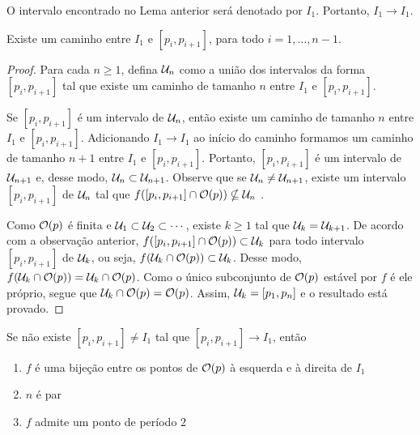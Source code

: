 O intervalo encontrado no Lema anterior será denotado por $I_1$. Portanto, $I_1 \longrightarrow I_1$.

\begin{lemma}
Existe um caminho entre $I_1$ e $[p_i, p_{i+1}]$, para todo $i = 1, \dots, n-1$.
\end{lemma}

\begin{proof}
Para cada $n \geq 1$, defina $\mathcal{U}_n$ como a união dos intervalos da forma $[p_i, p_{i+1}]$ tal que existe um caminho de tamanho $n$ entre $I_1$ e $[p_i, p_{i+1}]$.

Se $[p_i, p_{i+1}]$ é um intervalo de $\mathcal{U}_n$, então existe um caminho de tamanho $n$ entre $I_1$ e $[p_i, p_{i+1}]$. Adicionando $I_1 \longrightarrow I_1$ ao início do caminho formamos um caminho de tamanho $n+1$ entre  $I_1$ e $[p_i, p_{i+1}]$. Portanto, $[p_i, p_{i+1}]$ é um intervalo de $\mathcal{U}_{n+1}$ e, desse modo, $\mathcal{U}_n \subset \mathcal{U}_{n+1}$. Observe que se $\mathcal{U}_n \neq \mathcal{U}_{n+1}$, existe um intervalo  $[p_i, p_{i+1}]$ de $\mathcal{U}_n$ tal que $f([p_i, p_{i+1}] \cap \mathcal{O}(p)) \nsubseteq \mathcal{U}_n$ .

Como $\mathcal{O}(p)$ é finita e $\mathcal{U}_1 \subset \mathcal{U}_2 \subset \cdots$, existe $k \geq 1$ tal que $\mathcal{U}_k = \mathcal{U}_{k+1}$. De acordo com a observação anterior, $f([p_i, p_{i+1}] \cap \mathcal{O}(p)) \subset \mathcal{U}_k$ para todo intervalo $[p_i, p_{i+1}]$ de $\mathcal{U}_k$, ou seja, $f(\mathcal{U}_k \cap \mathcal{O}(p)) \subset \mathcal{U}_k$. Desse modo, $f(\mathcal{U}_k \cap \mathcal{O}(p)) = \mathcal{U}_k \cap \mathcal{O}(p)$. Como o único subconjunto de $\mathcal{O}(p)$ estável por $f$ é ele próprio, segue que $\mathcal{U}_k \cap \mathcal{O}(p) = \mathcal{O}(p)$. Assim, $\mathcal{U}_k = [p_1, p_n]$ e o resultado está provado.
\end{proof}

\begin{lemma}
Se não existe $[p_i, p_{i+1}]  \neq I_1$  tal que $[p_i, p_{i+1}] \longrightarrow I_1$, então
\begin{enumerate}
\item $f$ é uma bijeção entre os pontos de $\mathcal{O}(p)$ à esquerda e à direita de $I_1$
\item $n$ é par
\item $f$ admite um ponto de período $2$
\end{enumerate}
\end{lemma}

